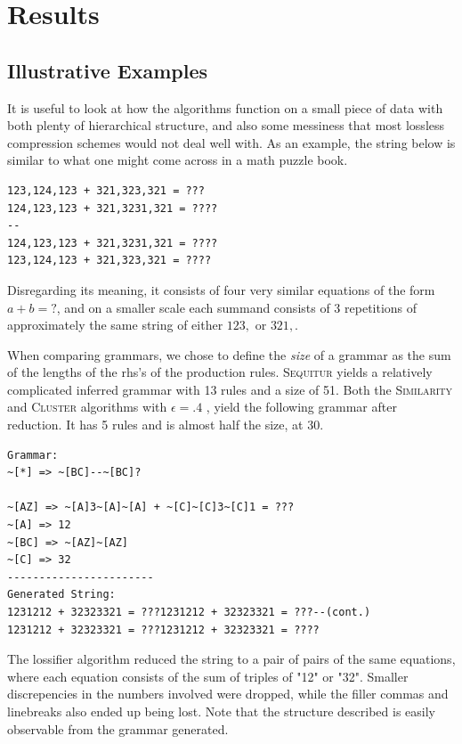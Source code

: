 \documentclass[11pt]{article}
\newcommand{\Sequitur}{\textsc{Sequitur}\xspace}
\newcommand{\Similarity}{\textsc{Similarity}\xspace}
\newcommand{\Cluster}{\textsc{Cluster}\xspace}
\begin{document}
\section{Results}

\subsection{Illustrative Examples}

It is useful to look at how the algorithms function on a small piece of data
with both plenty of hierarchical structure, and also some messiness that most
lossless compression schemes would not deal well with. As an example,
the string below is
similar to what one might come across in a math puzzle book.

\begin{verbatim}
123,124,123 + 321,323,321 = ???
124,123,123 + 321,3231,321 = ????
--
124,123,123 + 321,3231,321 = ????
123,124,123 + 321,323,321 = ????
\end{verbatim}

Disregarding its meaning, it consists of four very similar equations of the
form $a + b = ?$, and on a smaller scale each summand consists of 3 repetitions
of approximately the same string of either $123,$ or $321,$.

When comparing grammars, we chose to define the \emph{size} of a grammar as the
sum of the lengths of the rhs's of the production rules.  \Sequitur yields a
relatively complicated inferred grammar with 13 rules and a size of 51. Both
the \Similarity and \Cluster algorithms with $\epsilon = .4$ , yield the
following grammar after reduction. It has 5 rules and is almost half the size,
at 30.

\begin{verbatim}
Grammar:
~[*] => ~[BC]--~[BC]?

~[AZ] => ~[A]3~[A]~[A] + ~[C]~[C]3~[C]1 = ???
~[A] => 12
~[BC] => ~[AZ]~[AZ]
~[C] => 32
-----------------------
Generated String:
1231212 + 32323321 = ???1231212 + 32323321 = ???--(cont.)
1231212 + 32323321 = ???1231212 + 32323321 = ????
\end{verbatim}

The lossifier algorithm reduced the string to a pair of pairs of the same
equations, where each equation consists of the sum of triples of "12" or "32".
Smaller discrepencies in the numbers involved were dropped, while the filler
commas and linebreaks also ended up being lost. Note that the structure
described is easily observable from the grammar generated.
\end{document}
